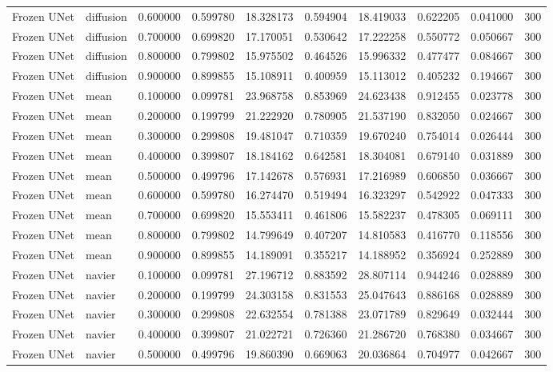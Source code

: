 \begin{table}[h]
\begin{tabular}{llrrrrrrrr}
Frozen UNet & diffusion & 0.600000 & 0.599780 & 18.328173 & 0.594904 & 18.419033 & 0.622205 & 0.041000 & 300 \\
Frozen UNet & diffusion & 0.700000 & 0.699820 & 17.170051 & 0.530642 & 17.222258 & 0.550772 & 0.050667 & 300 \\
Frozen UNet & diffusion & 0.800000 & 0.799802 & 15.975502 & 0.464526 & 15.996332 & 0.477477 & 0.084667 & 300 \\
Frozen UNet & diffusion & 0.900000 & 0.899855 & 15.108911 & 0.400959 & 15.113012 & 0.405232 & 0.194667 & 300 \\
Frozen UNet & mean & 0.100000 & 0.099781 & 23.968758 & 0.853969 & 24.623438 & 0.912455 & 0.023778 & 300 \\
Frozen UNet & mean & 0.200000 & 0.199799 & 21.222920 & 0.780905 & 21.537190 & 0.832050 & 0.024667 & 300 \\
Frozen UNet & mean & 0.300000 & 0.299808 & 19.481047 & 0.710359 & 19.670240 & 0.754014 & 0.026444 & 300 \\
Frozen UNet & mean & 0.400000 & 0.399807 & 18.184162 & 0.642581 & 18.304081 & 0.679140 & 0.031889 & 300 \\
Frozen UNet & mean & 0.500000 & 0.499796 & 17.142678 & 0.576931 & 17.216989 & 0.606850 & 0.036667 & 300 \\
Frozen UNet & mean & 0.600000 & 0.599780 & 16.274470 & 0.519494 & 16.323297 & 0.542922 & 0.047333 & 300 \\
Frozen UNet & mean & 0.700000 & 0.699820 & 15.553411 & 0.461806 & 15.582237 & 0.478305 & 0.069111 & 300 \\
Frozen UNet & mean & 0.800000 & 0.799802 & 14.799649 & 0.407207 & 14.810583 & 0.416770 & 0.118556 & 300 \\
Frozen UNet & mean & 0.900000 & 0.899855 & 14.189091 & 0.355217 & 14.188952 & 0.356924 & 0.252889 & 300 \\
Frozen UNet & navier & 0.100000 & 0.099781 & 27.196712 & 0.883592 & 28.807114 & 0.944246 & 0.028889 & 300 \\
Frozen UNet & navier & 0.200000 & 0.199799 & 24.303158 & 0.831553 & 25.047643 & 0.886168 & 0.028889 & 300 \\
Frozen UNet & navier & 0.300000 & 0.299808 & 22.632554 & 0.781388 & 23.071789 & 0.829649 & 0.032444 & 300 \\
Frozen UNet & navier & 0.400000 & 0.399807 & 21.022721 & 0.726360 & 21.286720 & 0.768380 & 0.034667 & 300 \\
Frozen UNet & navier & 0.500000 & 0.499796 & 19.860390 & 0.669063 & 20.036864 & 0.704977 & 0.042667 & 300 \\

\end{tabular}
\end{table}

